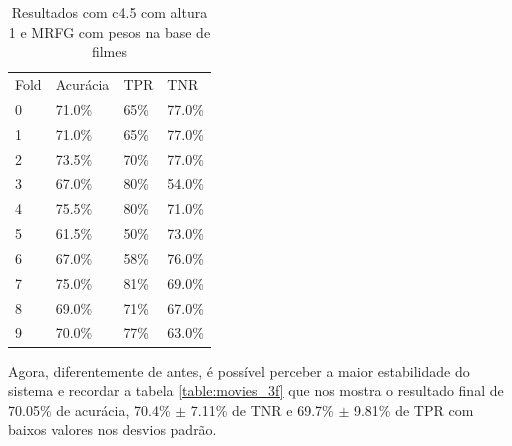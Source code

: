 \documentclass[template.tex]{subfiles}
\begin{document}
\begin{table}[htbp]
	\centering
    \begin{tabular}{llll}
    Fold & Acurácia & TPR & TNR \\
    0 & 71.0\% & 65\% & 77.0\% \\
    1 & 71.0\% & 65\% & 77.0\% \\
    2 & 73.5\% & 70\% & 77.0\% \\
    3 & 67.0\% & 80\% & 54.0\% \\
    4 & 75.5\% & 80\% & 71.0\% \\
    5 & 61.5\% & 50\% & 73.0\% \\
    6 & 67.0\% & 58\% & 76.0\% \\
    7 & 75.0\% & 81\% & 69.0\% \\
    8 & 69.0\% & 71\% & 67.0\% \\
    9 & 70.0\% & 77\% & 63.0\% \\
    \end{tabular}
    \caption{Resultados com c4.5 com altura 1 e MRFG com pesos na base de filmes}
    \label{table:movie_folds_3}
\end{table}

Agora, diferentemente de antes, é possível perceber a maior estabilidade do sistema e recordar a tabela \ref{table:movies_3f} que nos mostra o resultado final de 70.05\% de acurácia, 70.4\% $\pm$ 7.11\% de TNR e 69.7\% $\pm$ 9.81\%  de TPR com baixos valores nos desvios padrão.

%
\end{document}
